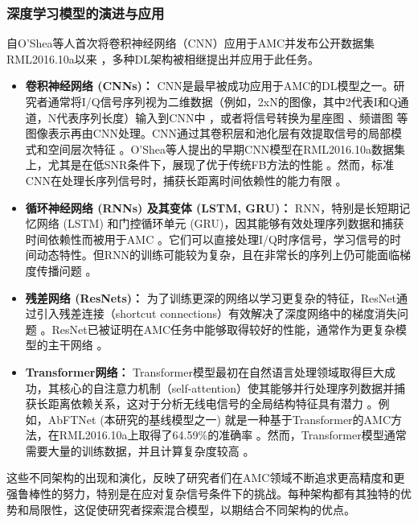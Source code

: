 \documentclass[conference]{IEEEtran}
\begin{document}
\subsubsection{深度学习模型的演进与应用}
自O'Shea等人首次将卷积神经网络（CNN）应用于AMC并发布公开数据集RML2016.10a以来 \cite{oshea2016convolutional}\cite{oshea2016radio}\cite{[36_MISSING]}\cite{b2}\cite{b3}\cite{b4}，多种DL架构被相继提出并应用于此任务。 %
\begin{itemize}
    \item \textbf{卷积神经网络 (CNNs)：} CNN是最早被成功应用于AMC的DL模型之一。研究者通常将I/Q信号序列视为二维数据（例如，2xN的图像，其中2代表I和Q通道，N代表序列长度）输入到CNN中 \cite{b4}\cite{oshea2016convolutional}，或者将信号转换为星座图 \cite{[19]}、频谱图 \cite{[29_MISSING]} 等图像表示再由CNN处理。CNN通过其卷积层和池化层有效提取信号的局部模式和空间层次特征 \cite{[5]}。O'Shea等人提出的早期CNN模型在RML2016.10a数据集上，尤其是在低SNR条件下，展现了优于传统FB方法的性能 \cite{oshea2016convolutional}。然而，标准CNN在处理长序列信号时，捕获长距离时间依赖性的能力有限 \cite{[5]}。
    \item \textbf{循环神经网络 (RNNs) 及其变体 (LSTM, GRU)：} RNN，特别是长短期记忆网络 (LSTM) 和门控循环单元 (GRU)，因其能够有效处理序列数据和捕获时间依赖性而被用于AMC \cite{[14_MISSING]}\cite{[28_MISSING]}\cite{[29_MISSING]}\cite{[37_MISSING]}。它们可以直接处理I/Q时序信号，学习信号的时间动态特性。但RNN的训练可能较为复杂，且在非常长的序列上仍可能面临梯度传播问题 \cite{[5]}。
    \item \textbf{残差网络 (ResNets)：} 为了训练更深的网络以学习更复杂的特征，ResNet通过引入残差连接（shortcut connections）有效解决了深度网络中的梯度消失问题 \cite{[13]}\cite{[14_MISSING]}。ResNet已被证明在AMC任务中能够取得较好的性能，通常作为更复杂模型的主干网络 \cite{b4}\cite{[29_MISSING]}\cite{oshea2016radio}。
    \item \textbf{Transformer网络：} Transformer模型最初在自然语言处理领域取得巨大成功，其核心的自注意力机制（self-attention）使其能够并行处理序列数据并捕获长距离依赖关系，这对于分析无线电信号的全局结构特征具有潜力 \cite{[29_MISSING]}\cite{[38_MISSING]}\cite{[39_MISSING]}\cite{[40_MISSING]}。例如，AbFTNet \cite{b3} (本研究的基线模型之一) 就是一种基于Transformer的AMC方法，在RML2016.10a上取得了64.59\%的准确率 \cite{[38_MISSING]}\cite{[41_MISSING]}。然而，Transformer模型通常需要大量的训练数据，并且计算复杂度较高 \cite{[5]}\cite{[39_MISSING]}。
\end{itemize}
这些不同架构的出现和演化，反映了研究者们在AMC领域不断追求更高精度和更强鲁棒性的努力，特别是在应对复杂信号条件下的挑战。每种架构都有其独特的优势和局限性，这促使研究者探索混合模型，以期结合不同架构的优点。
\end{document}
